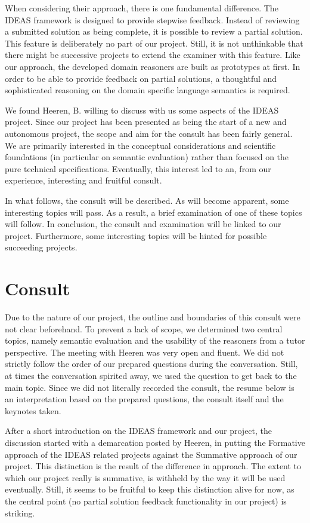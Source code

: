 When considering their approach, there is one fundamental difference. The IDEAS
framework is designed to provide stepwise feedback. Instead of reviewing a
submitted solution as being complete, it is possible to review a partial 
solution. This feature is deliberately no part of our project. Still, it is 
not unthinkable that there might be successive projects to extend the \gls{
examiner} with this feature. Like our approach, the developed domain reasoners 
are built as prototypes at first. In order to be able to provide feedback on partial solutions, a thoughtful and sophisticated reasoning on the domain specific language semantics is required.


We found Heeren, B. willing to discuss with us some aspects of the IDEAS 
project. Since our project has been presented as being the start of a new and 
autonomous project, the scope and aim for the consult has been fairly general. 
We are primarily interested in the conceptual considerations and scientific 
foundations (in particular on semantic evaluation) rather than focused on the 
pure technical specifications. Eventually, this interest led to an, from our 
experience, interesting and fruitful consult. 

In what follows, the consult will be described. As will become apparent, some 
interesting topics will pass. As a result, a brief examination of one of these 
topics will follow. In conclusion, the consult and examination will be linked 
to our project. Furthermore, some interesting topics will be hinted for 
possible succeeding projects.


\section{Consult}
Due to the nature of our project, the outline and boundaries of this consult 
were not clear beforehand. To prevent a lack of scope, we determined two 
central topics, namely semantic evaluation and the usability of the reasoners 
from a tutor perspective. The meeting with Heeren was very open and fluent. We 
did not strictly follow the order of our prepared questions during the 
conversation. Still, at times the 
conversation spirited away, we used the question to get back to the main 
topic. Since we did not literally recorded the consult, the resume below is an 
interpretation based on the prepared questions, the consult itself and the 
keynotes taken.

After a short introduction on the IDEAS framework and our project, the 
discussion started with a demarcation posted by Heeren, in putting the 
Formative approach of the IDEAS related projects against the Summative 
approach of our project. This distinction is the result of the difference in 
approach. The extent to which our project really is summative, is withheld by 
the way it will be used eventually. %
Still, it seems to be fruitful to keep this distinction alive for now, as the 
central point (no partial solution feedback functionality in our project) is 
striking. 

